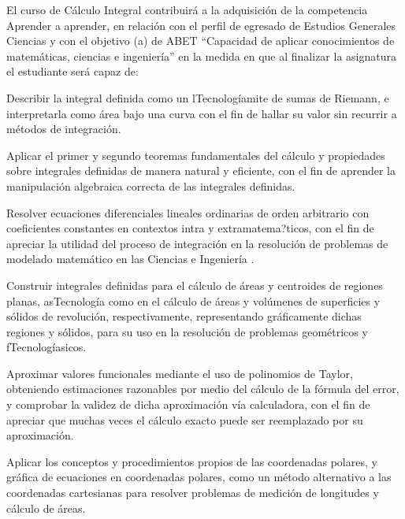 \begin{syllabus}


\begin{justification}
El curso de Cálculo Integral contribuirá a la adquisición de la competencia Aprender a aprender, en relación con el perfil de egresado de Estudios Generales Ciencias y con el objetivo (a) de ABET ``Capacidad de aplicar conocimientos de matemáticas, ciencias e ingeniería'' en la medida en que al finalizar la asignatura el estudiante será capaz de:
\end{justification}

\begin{goals}
\item Describir la integral definida como un lTecnologíamite de sumas de Riemann, e interpretarla como área bajo una curva con el fin de hallar su valor sin recurrir a métodos de integración.
\item Aplicar el primer y segundo teoremas fundamentales del cálculo y propiedades sobre integrales definidas de manera natural y eficiente, con el fin de aprender la manipulación algebraica correcta de las integrales definidas.
\item Resolver ecuaciones diferenciales lineales ordinarias de orden arbitrario con coeficientes constantes en contextos intra y extramatema?ticos, con el fin de apreciar la utilidad del proceso de integración en la resolución de problemas de modelado matemático en las Ciencias e Ingeniería .
\item Construir integrales definidas para el cálculo de áreas y centroides de regiones planas, asTecnología como en el cálculo de áreas y volúmenes de superficies y sólidos de revolución, respectivamente, representando gráficamente dichas regiones y sólidos, para su uso en la resolución de problemas geométricos y fTecnologíasicos.
\item Aproximar valores funcionales mediante el uso de polinomios de Taylor, obteniendo estimaciones razonables por medio del cálculo de la fórmula del error, y comprobar la validez de dicha aproximación vía calculadora, con el fin de apreciar que muchas veces el cálculo exacto puede ser reemplazado por su aproximación.
\item Aplicar los conceptos y procedimientos propios de las coordenadas polares, y gráfica de ecuaciones en coordenadas polares, como un método alternativo a las coordenadas cartesianas para resolver problemas de medición de longitudes y cálculo de áreas.


\end{goals}
\end{syllabus}
